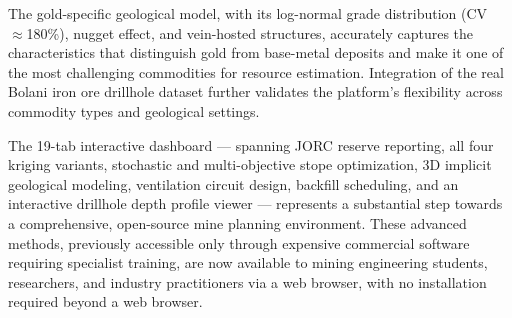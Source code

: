 \documentclass[12pt,a4paper]{article}
\begin{document}
The gold-specific geological model, with its log-normal grade distribution (CV~$\approx$180\%), nugget effect, and vein-hosted structures, accurately captures the characteristics that distinguish gold from base-metal deposits and make it one of the most challenging commodities for resource estimation. Integration of the real Bolani iron ore drillhole dataset further validates the platform's flexibility across commodity types and geological settings.

The 19-tab interactive dashboard --- spanning JORC reserve reporting, all four kriging variants, stochastic and multi-objective stope optimization, 3D implicit geological modeling, ventilation circuit design, backfill scheduling, and an interactive drillhole depth profile viewer --- represents a substantial step towards a comprehensive, open-source mine planning environment. These advanced methods, previously accessible only through expensive commercial software requiring specialist training, are now available to mining engineering students, researchers, and industry practitioners via a web browser, with no installation required beyond a web browser.
\end{document}
